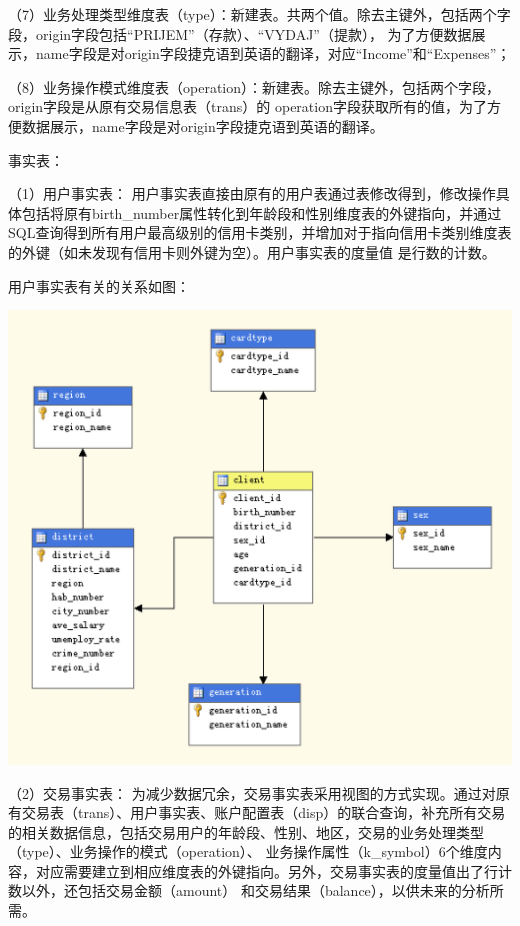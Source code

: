 \documentclass[a4paper]{article}
\begin{document}
\begin{enumerate}
  （7）业务处理类型维度表（type）：新建表。共两个值。除去主键外，包括两个字段，origin字段包括“PRIJEM”（存款）、“VYDAJ”（提款），
  为了方便数据展示，name字段是对origin字段捷克语到英语的翻译，对应“Income”和“Expenses”；

  （8）业务操作模式维度表（operation）：新建表。除去主键外，包括两个字段，origin字段是从原有交易信息表（trans）的
  operation字段获取所有的值，为了方便数据展示，name字段是对origin字段捷克语到英语的翻译。
  
  事实表：

  （1）用户事实表：
  用户事实表直接由原有的用户表通过表修改得到，修改操作具体包括将原有birth\_number属性转化到年龄段和性别维度表的外键指向，并通过
  SQL查询得到所有用户最高级别的信用卡类别，并增加对于指向信用卡类别维度表的外键（如未发现有信用卡则外键为空）。用户事实表的度量值
  是行数的计数。

  用户事实表有关的关系如图：
  \begin{center}
    \includegraphics[scale=0.38]{Pictures/CLIENTP}
  \end{center}

  （2）交易事实表：
  为减少数据冗余，交易事实表采用视图的方式实现。通过对原有交易表（trans）、用户事实表、账户配置表（disp）的联合查询，补充所有交易
  的相关数据信息，包括交易用户的年龄段、性别、地区，交易的业务处理类型（type）、业务操作的模式（operation）、
  业务操作属性（k\_symbol）6个维度内容，对应需要建立到相应维度表的外键指向。另外，交易事实表的度量值出了行计数以外，还包括交易金额（amount）
  和交易结果（balance），以供未来的分析所需。


\end{enumerate}
\end{document}
